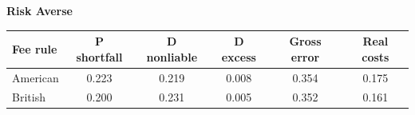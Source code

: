 \documentclass[10pt,border=5pt,varwidth=17cm]{standalone}
\begin{document}
\begingroup
\small
\setlength{\tabcolsep}{5pt}
\renewcommand{\arraystretch}{1.20}
\noindent\textbf{Risk Averse}\par\smallskip
\noindent\begin{tabularx}{\linewidth}{@{}>{\raggedright\arraybackslash}Xccccc@{}}
\toprule
\textbf{Fee rule} & \textbf{P shortfall} & \textbf{D nonliable} & \textbf{D excess} & \textbf{Gross error} & \textbf{Real costs} \\
\midrule
American & 0.223 & 0.219 & 0.008 & 0.354 & 0.175 \\
British & 0.200 & 0.231 & 0.005 & 0.352 & 0.161 \\
\bottomrule\end{tabularx}\par\medskip
\endgroup
\end{document}
